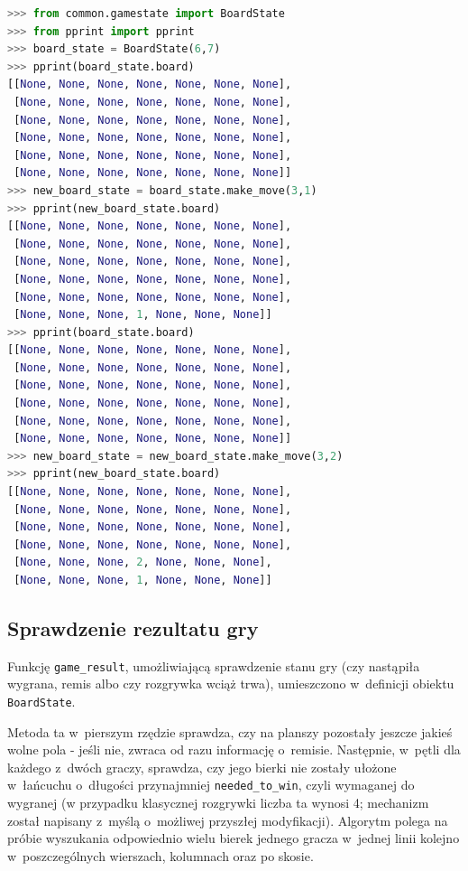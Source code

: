 \documentclass[a4paper, 12pt, oneside]{report}
\begin{document}
\begin{lstlisting}[language=Python, caption=Operacje na obiektach \texttt{BoardState} -- sesja interaktywna interpretera]
>>> from common.gamestate import BoardState
>>> from pprint import pprint              
>>> board_state = BoardState(6,7)          
>>> pprint(board_state.board)              
[[None, None, None, None, None, None, None],
 [None, None, None, None, None, None, None],
 [None, None, None, None, None, None, None],
 [None, None, None, None, None, None, None],
 [None, None, None, None, None, None, None],
 [None, None, None, None, None, None, None]]
>>> new_board_state = board_state.make_move(3,1)
>>> pprint(new_board_state.board)               
[[None, None, None, None, None, None, None],
 [None, None, None, None, None, None, None],
 [None, None, None, None, None, None, None],
 [None, None, None, None, None, None, None],
 [None, None, None, None, None, None, None],
 [None, None, None, 1, None, None, None]]
>>> pprint(board_state.board)
[[None, None, None, None, None, None, None],
 [None, None, None, None, None, None, None],
 [None, None, None, None, None, None, None],
 [None, None, None, None, None, None, None],
 [None, None, None, None, None, None, None],
 [None, None, None, None, None, None, None]]
>>> new_board_state = new_board_state.make_move(3,2)
>>> pprint(new_board_state.board)
[[None, None, None, None, None, None, None],
 [None, None, None, None, None, None, None],
 [None, None, None, None, None, None, None],
 [None, None, None, None, None, None, None],
 [None, None, None, 2, None, None, None],
 [None, None, None, 1, None, None, None]]

\end{lstlisting}

\subsection{Sprawdzenie rezultatu gry}

\begin{sloppypar}
Funkcję \texttt{game\_result}, umożliwiającą sprawdzenie stanu gry (czy nastąpiła wygrana, remis albo czy rozgrywka wciąż trwa), umieszczono w~definicji obiektu \texttt{BoardState}.
\end{sloppypar}

Metoda ta w~pierszym rzędzie sprawdza, czy na planszy pozostały jeszcze jakieś wolne pola - jeśli nie, zwraca od razu informację o~remisie. Następnie, w~pętli dla każdego z~dwóch graczy, sprawdza, czy jego bierki nie zostały ułożone w~łańcuchu o~długości przynajmniej \texttt{needed\_to\_win}, czyli wymaganej do wygranej (w przypadku klasycznej rozgrywki liczba ta wynosi 4; mechanizm został napisany z~myślą o~możliwej przyszłej modyfikacji). Algorytm polega na próbie wyszukania odpowiednio wielu bierek jednego gracza w~jednej linii kolejno w~poszczególnych wierszach, kolumnach oraz po skosie.
\end{document}
